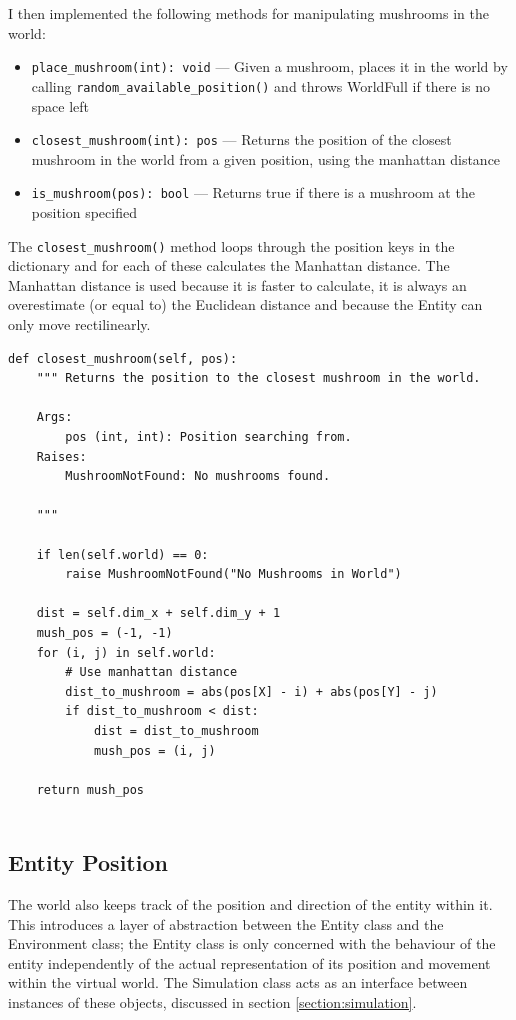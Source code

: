 \documentclass[12pt,a4paper,twoside,openright]{report}
\renewcommand{\baselinestretch}{1.1}    %
\begin{document}
I then implemented the following methods for manipulating mushrooms in the world:

\begin{itemize}
	\item \texttt{place\_mushroom(int): void} --- Given a mushroom, places it in the world by calling \texttt{random\_available\_position()} and throws WorldFull if there is no space left
	\item \texttt{closest\_mushroom(int): pos} --- Returns the position of the closest mushroom in the world from a given position, using the manhattan distance
	\item \texttt{is\_mushroom(pos): bool} --- Returns true if there is a mushroom at the position specified
\end{itemize}

The \texttt{closest\_mushroom()} method loops through the position keys in the dictionary and for each of these calculates the Manhattan distance. The Manhattan distance is used because it is faster to calculate, it is always an overestimate (or equal to) the Euclidean distance and because the Entity can only move rectilinearly. 

{\renewcommand{\baselinestretch}{0.8}\small
\begin{verbatim}
def closest_mushroom(self, pos):
    """ Returns the position to the closest mushroom in the world.
    
    Args:
        pos (int, int): Position searching from.
    Raises:
        MushroomNotFound: No mushrooms found.

    """

    if len(self.world) == 0:
        raise MushroomNotFound("No Mushrooms in World")
        
    dist = self.dim_x + self.dim_y + 1
    mush_pos = (-1, -1)
    for (i, j) in self.world:
        # Use manhattan distance
        dist_to_mushroom = abs(pos[X] - i) + abs(pos[Y] - j)
        if dist_to_mushroom < dist:
            dist = dist_to_mushroom
            mush_pos = (i, j)

    return mush_pos
	
\end{verbatim}
}

\subsection{Entity Position}

The world also keeps track of the position and direction of the entity within it. This introduces a layer of abstraction between the Entity class and the Environment class; the Entity class is only concerned with the behaviour of the entity independently of the actual representation of its position and movement within the virtual world. The Simulation class acts as an interface between instances of these objects, discussed in section \ref{section:simulation}.
\end{document}
